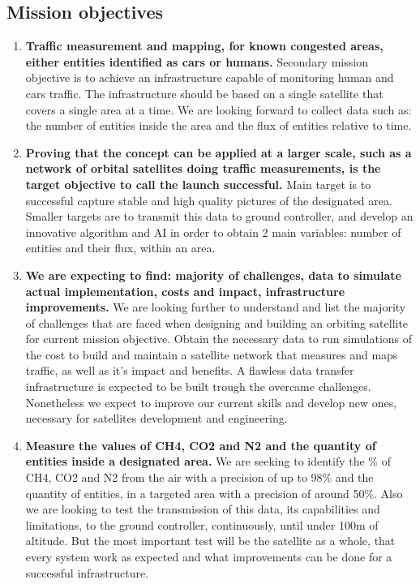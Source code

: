 \documentclass[11pt]{article}
\begin{document}
\subsection{Mission objectives}
\begin{enumerate}
    \item\textbf{Traffic measurement and mapping, for known congested areas, either entities identified as cars or humans.} {Secondary mission objective is to achieve an infrastructure capable of monitoring human and cars traffic. The infrastructure should be based on a single satellite that covers a single area at a time. We are looking forward to collect data such as: the number of entities inside the area and the flux of entities relative to time.}
    \item\textbf{Proving that the concept can be applied at a larger scale, such as a network of orbital satellites doing traffic measurements, is the target objective to call the launch successful.} {Main target is to successful capture stable and high quality pictures of the designated area. Smaller targets are to transmit this data to ground controller, and develop an innovative algorithm and AI in order to obtain 2 main variables: number of entities and their flux, within an area.}
    \item\textbf{We are expecting to find: majority of challenges, data to simulate actual implementation, costs and impact, infrastructure improvements.} {We are looking further to understand and list the majority of challenges that are faced when designing and building an orbiting satellite for current mission objective. Obtain the necessary data to run simulations of the cost to build and maintain a satellite network that measures and maps traffic, as well as it's impact and benefits. A flawless data transfer infrastructure is expected to be built trough the overcame challenges. Nonetheless we expect to improve our current skills and develop new ones, necessary for satellites development and engineering.}
    \item\textbf{Measure the values of CH4, CO2 and N2 and the quantity of entities inside a designated area.} {We are seeking to identify the \% of CH4, CO2 and N2 from the air with a precision of up to 98\% and the quantity of entities, in a targeted area with a precision of around 50\%. Also we are looking to test the transmission of this data, its capabilities and limitations, to the ground controller, continuously, until under 100m of altitude. But the most important test will be the satellite as a whole, that every system work as expected and what improvements can be done for a successful infrastructure.}
\end{enumerate}
\end{document}
